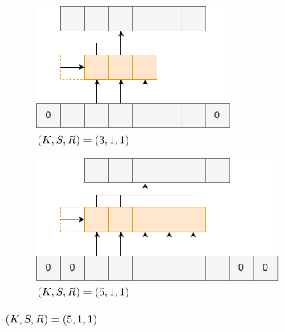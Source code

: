 \begin{figure}[tb]
    \centering
    \begin{subfigure}[b]{0.48\textwidth}
        \centering
        \includegraphics[height=4cm]{./figure/sec3/conv1.drawio.png}
        \caption{$\left(K, S, R\right) = \left(3, 1, 1\right)$}
        \label{sec3:fig:conv1}
    \end{subfigure}
    \begin{subfigure}[b]{0.48\textwidth}
        \centering
        \includegraphics[height=4cm]{./figure/sec3/conv2.drawio.png}
        \caption{$\left(K, S, R\right) = \left(5, 1, 1\right)$}
        \label{sec3:fig:conv2}
    \end{subfigure}

    \vspace{0.5cm}


\end{figure}
